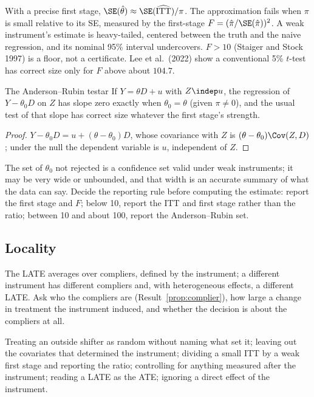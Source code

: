 \documentclass[11pt]{article}
\begin{document}
With a precise first stage, $\SE(\hat\theta) \approx \SE(\widehat{\text{ITT}})/\pi$. The approximation fails when $\pi$ is small relative to its
SE, measured by the first-stage $F = (\hat\pi/\SE(\hat\pi))^2$. A weak instrument's estimate is heavy-tailed, centered between the truth
and the naive regression, and its nominal 95\% interval undercovers. $F > 10$ (Staiger and Stock 1997) is a floor, not a certificate. Lee
et al.\ (2022) show a conventional 5\% $t$-test has correct size only for $F$ above about $104.7$.

\begin{prop}{The Anderson--Rubin test}{ar}
If $Y = \theta D + u$ with $Z \indep u$, the regression of $Y - \theta_0D$ on $Z$ has slope zero exactly when $\theta_0 = \theta$ (given $\pi \ne 0$),
and the usual test of that slope has correct size whatever the first stage's strength.
\end{prop}
\begin{proof}
$Y - \theta_0D = u + (\theta - \theta_0)D$, whose covariance with $Z$ is $(\theta - \theta_0)\Cov(Z, D)$; under the null the dependent variable is
$u$, independent of $Z$.
\end{proof}

The set of $\theta_0$ not rejected is a confidence set valid under weak instruments; it may be very wide or unbounded, and that
width is an accurate summary of what the data can say. Decide the reporting rule before computing the estimate: report the first stage and $F$; below 10, report the ITT and first stage
rather than the ratio; between 10 and about 100, report the Anderson--Rubin set.

\subsection{Locality}

The LATE averages over compliers, defined by the instrument; a different instrument has different compliers and, with heterogeneous
effects, a different LATE. Ask who the compliers are (Result~\ref{prop:complier}), how large a change in treatment the instrument
induced, and whether the decision is about the compliers at all.

\begin{pitfall}[IV errors]
Treating an outside shifter as random without naming what set it; leaving out the covariates that determined the instrument;
dividing a small ITT by a weak first stage and reporting the ratio; controlling for anything measured after the instrument; reading a
LATE as the ATE; ignoring a direct effect of the instrument.
\end{pitfall}
\end{document}
